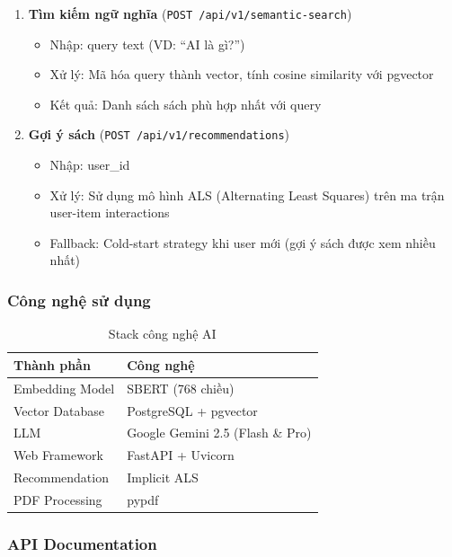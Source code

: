 \begin{enumerate}
    \item \textbf{Tìm kiếm ngữ nghĩa} (\texttt{POST /api/v1/semantic-search})
    \begin{itemize}
        \item Nhập: query text (VD: ``AI là gì?'')
        \item Xử lý: Mã hóa query thành vector, tính cosine similarity với pgvector
        \item Kết quả: Danh sách sách phù hợp nhất với query
    \end{itemize}
    
    \item \textbf{Gợi ý sách} (\texttt{POST /api/v1/recommendations})
    \begin{itemize}
        \item Nhập: user\_id
        \item Xử lý: Sử dụng mô hình ALS (Alternating Least Squares) trên ma trận user-item interactions
        \item Fallback: Cold-start strategy khi user mới (gợi ý sách được xem nhiều nhất)
    \end{itemize}
\end{enumerate}

\subsubsection{Công nghệ sử dụng}

\begin{table}[h]
    \centering
    \begin{tabular}{|l|l|}
    \hline
    \textbf{Thành phần} & \textbf{Công nghệ} \\
    \hline
    Embedding Model & SBERT (768 chiều) \\
    \hline
    Vector Database & PostgreSQL + pgvector \\
    \hline
    LLM & Google Gemini 2.5 (Flash \& Pro) \\
    \hline
    Web Framework & FastAPI + Uvicorn \\
    \hline
    Recommendation & Implicit ALS \\
    \hline
    PDF Processing & pypdf \\
    \hline
    \end{tabular}
    \caption{Stack công nghệ AI}
\end{table}

\subsubsection{API Documentation}

